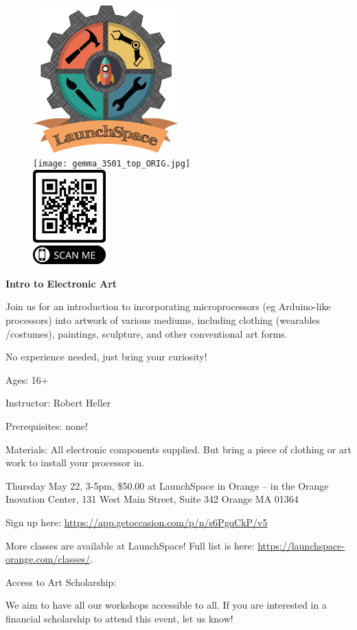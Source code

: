 \documentclass[12pt]{article}
\begin{document}
\begin{figure}
\centering
\includegraphics[width=0.5\textwidth]{Copy-of-launchSpace_Color-copy.png}\\
\vspace{12pt}
\texttt{[image: gemma\_3501\_top\_ORIG.jpg]}\\
\vspace{12pt}
\includegraphics[width=0.25\textwidth]{LaunchSpaceGemmaClass.png}
\end{figure}


{\LARGE \textbf{Intro to Electronic Art\\}}
 
{\Large

Join us for an introduction to incorporating microprocessors (eg Arduino-like 
processors) into artwork of various mediums, including clothing (wearables /costumes), paintings, sculpture, and other conventional art forms. 

No experience needed, just bring your curiosity!

Ages: 16+

Instructor: Robert Heller

Prerequisites: none!

Materials:  All electronic components supplied.  But bring a piece of clothing 
or art work to install your processor in. 

Thursday May 22, 3-5pm, \$50.00 at LaunchSpace in Orange -- in the Orange 
Inovation Center, 131 West Main Street, Suite 342
Orange MA 01364

}


Sign up here: \url{https://app.getoccasion.com/p/n/s6PgqCkP/v5} 

More classes are available at LaunchSpace! Full list is here: 
\url{https://launchspace-orange.com/classes/}.

Access to Art Scholarship:

We aim to have all our workshops accessible to all. If you are interested in a 
financial scholarship to attend this event, let us know! 
\end{document}
